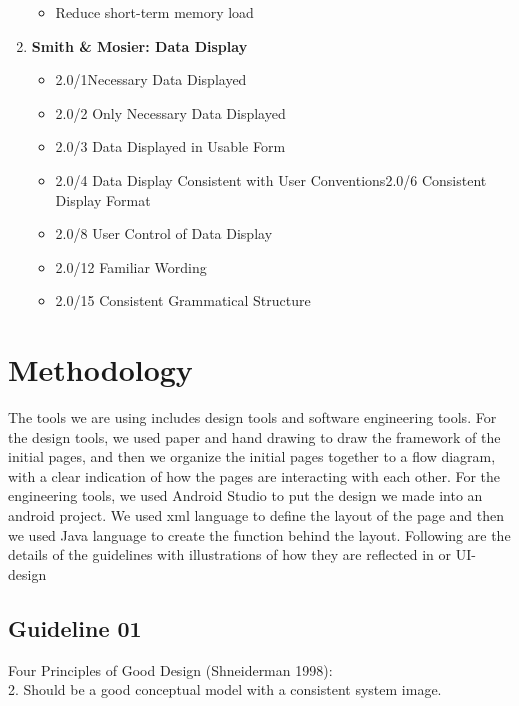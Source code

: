 \documentclass{article}
\begin{document}
\begin{enumerate}
\begin{itemize}
\item Reduce short-term memory load
\end{itemize}
\item{\bf Smith \& Mosier: Data Display}
\begin{itemize}
\item 2.0/1Necessary Data Displayed
\item 2.0/2 Only Necessary Data Displayed
\item 2.0/3 Data Displayed in Usable Form
\item 2.0/4 Data Display Consistent with User Conventions2.0/6 Consistent Display Format
\item 2.0/8 User Control of Data Display
\item 2.0/12 Familiar Wording
\item 2.0/15 Consistent Grammatical Structure
\end{itemize}
\end{enumerate}

\section{Methodology}
The tools we are using includes design tools and software engineering tools.
For the design tools, we used paper and hand drawing to draw the framework of the initial pages, and then we organize
the initial pages together to a flow diagram, with a clear indication of how the pages are interacting with each other.
For the engineering tools, we used Android Studio to put the design we made into an android project. We used xml
language to define the layout of the page and then we used Java language to create the function behind the layout. Following are the details of the guidelines with illustrations of how they are reflected in or 
UI-design

\subsection{Guideline 01}
Four Principles of Good Design (Shneiderman 1998):\\
2. Should be a good conceptual model with a consistent system image.\\
\end{document}
